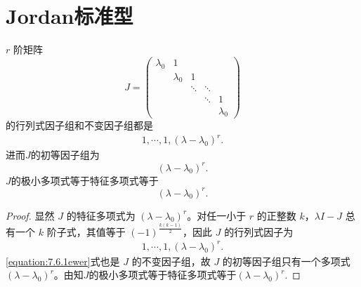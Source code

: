 \documentclass[../../main.tex]{subfiles}%
\begin{document}
\section{Jordan标准型}

\begin{lemma}\label{lemma:Jordan块的初等因子组}
$r$ 阶矩阵
\[
J = \begin{pmatrix}
\lambda_0 & 1 & & & \\
& \lambda_0 & 1 & & \\
& & \ddots & \ddots & \\
& & & \ddots & 1 \\
& & & & \lambda_0
\end{pmatrix}
\]
的行列式因子组和不变因子组都是
\begin{align*}
1,\cdots,1,(\lambda - \lambda_0)^r.
\end{align*}
进而$J$的初等因子组为
$$
(\lambda - \lambda_0)^r.
$$
$J$的极小多项式等于特征多项式等于
$$
(\lambda - \lambda_0)^r.
$$
\end{lemma}
\begin{proof}

显然 $J$ 的特征多项式为 $(\lambda - \lambda_0)^r$。对任一小于 $r$ 的正整数 $k$，$\lambda I - J$ 总有一个 $k$ 阶子式，其值等于 $(-1)^{\frac{k(k-1)}{2}}$，因此 $J$ 的行列式因子为
\begin{align}
1,\cdots,1,(\lambda - \lambda_0)^r.
\label{equation:7.6.1ewer}
\end{align}
\eqref{equation:7.6.1ewer}式也是 $J$ 的不变因子组，故 $J$ 的初等因子组只有一个多项式 $(\lambda - \lambda_0)^r$。由知$J$的极小多项式等于特征多项式等于$(\lambda - \lambda_0)^r.$

\end{proof}
\end{document}

